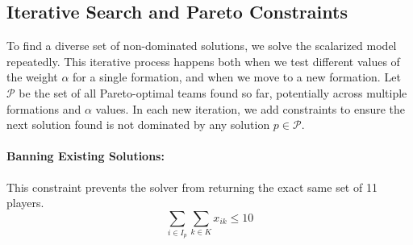 \documentclass{article}
\begin{document}
\subsection{Iterative Search and Pareto Constraints}
To find a diverse set of non-dominated solutions, we solve the scalarized model repeatedly. This iterative process happens both when we test different values of the weight $\alpha$ for a single formation, and when we move to a new formation. Let $\mathcal{P}$ be the set of all Pareto-optimal teams found so far, potentially across multiple formations and $\alpha$ values. In each new iteration, we add constraints to ensure the next solution found is not dominated by any solution $p \in \mathcal{P}$.

\paragraph{Banning Existing Solutions:} This constraint prevents the solver from returning the exact same set of 11 players.
\begin{equation}
\sum_{i \in I_p} \sum_{k \in K} x_{ik} \leq 10
\end{equation}
\end{document}
